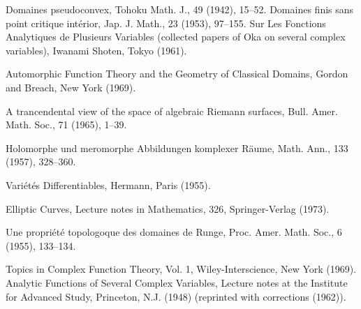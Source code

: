 \begin{sourcebibliography}
 Domaines pseudoconvex, Tohoku Math. J., 49 (1942), 15--52.
 Domaines finis sans point critique int\'erior, Jap. J. Math., 23 (1953), 97--155.
 Sur Les Fonctions Analytiques de Plusieurs Variables (collected papers of Oka on several complex variables), Iwanami Shoten, Tokyo (1961).
\end{sourcebibliography}
\begin{sourcebibliography}
 Automorphic Function Theory and the Geometry of Classical Domains, Gordon and Breach, New York (1969).
\end{sourcebibliography}
\begin{sourcebibliography}
 A trancendental view of the space of algebraic Riemann surfaces, Bull. Amer. Math. Soc., 71 (1965), 1--39.
\end{sourcebibliography}
\begin{sourcebibliography}
 Holomorphe und meromorphe Abbildungen komplexer R\"aume, Math. Ann., 133 (1957), 328--360.
\end{sourcebibliography}
\begin{sourcebibliography}
 Vari\'et\'es Differentiables, Hermann, Paris (1955).
\end{sourcebibliography}
\begin{sourcebibliography}
 Elliptic Curves, Lecture notes in Mathematics, 326, Springer-Verlag (1973).
\end{sourcebibliography}
\begin{sourcebibliography}
 Une propri\'et\'e topologoque des domaines de Runge, Proc. Amer. Math. Soc., 6 (1955), 133--134.
\end{sourcebibliography}
\begin{sourcebibliography}
 Topics in Complex Function Theory, Vol. 1, Wiley-Interscience, New York (1969).
 Analytic Functions of Several Complex Variables, Lecture notes at the Institute for Advanced Study, Princeton, N.J. (1948) (reprinted with corrections (1962)).
\end{sourcebibliography}
